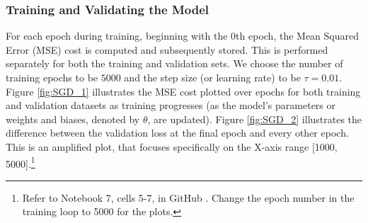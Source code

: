\subsubsection{Training and Validating the Model}
For each epoch during training, beginning with the 0th epoch, the Mean Squared Error (MSE) cost is computed and subsequently stored. This is performed separately for both the training and validation sets. We choose the number of training epochs to be $5000$ and the step size (or learning rate) to be $\tau=0.01$. Figure \ref{fig:SGD_1} illustrates the MSE cost plotted over epochs for both training and validation datasets as training progresses (as the model's parameters or weights and biases, denoted by $\theta$, are updated). Figure \ref{fig:SGD_2} illustrates the difference between the validation loss at the final epoch and every other epoch. This is an amplified plot, that focuses specifically on the X-axis range [1000, 5000].\footnote{Refer to Notebook 7, cells 5-7, in GitHub \cite{ThesisCode2023}. Change the epoch number in the training loop to 5000 for the plots.} 

